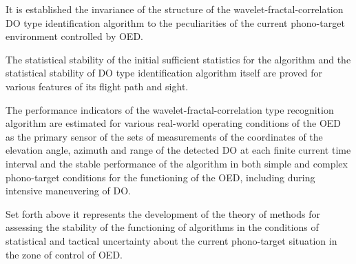 It is established the invariance of the structure of the wavelet-fractal-correlation DO type identification algorithm to the peculiarities of the current phono-target environment controlled by OED.

The statistical stability of the initial sufficient statistics for the algorithm and the statistical stability of DO type identification algorithm itself are proved for various features of its flight path and sight.

The performance indicators of the wavelet-fractal-correlation type recognition algorithm are estimated for various real-world operating conditions of the OED as the primary sensor of the sets of measurements of the coordinates of the elevation angle, azimuth and range of the detected DO at each finite current time interval and the stable performance of the algorithm in both simple and complex phono-target conditions for the functioning of the OED, including during intensive maneuvering of DO.

Set forth above it represents the development of the theory of methods for assessing the stability of the functioning of algorithms in the conditions of statistical and tactical uncertainty about the current phono-target situation in the zone of control of OED.
